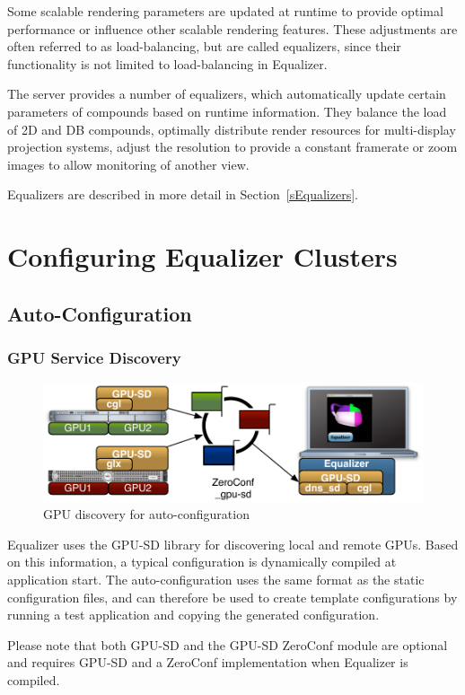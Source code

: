 \documentclass[10pt,a4]{scrartcl}
\newcommand{\sref}[1]{Section~\ref{#1}}
\begin{document}
Some scalable rendering parameters are updated at runtime to provide
optimal performance or influence other scalable rendering
features. These adjustments are often referred to as load-balancing, but
are called \textsf{equalizers}, since their functionality is not limited
to load-balancing in Equalizer.

The server provides a number of equalizers, which automatically update
certain parameters of compounds based on runtime information. They
balance the load of 2D and DB compounds, optimally distribute render
resources for multi-display projection systems, adjust the resolution
to provide a constant framerate or zoom images to allow monitoring of
another view.

Equalizers are described in more detail in \sref{sEqualizers}.


\section{\label{sConfig}Configuring Equalizer Clusters}

\subsection{\label{sAutoConfig}Auto-Configuration}

\subsubsection{GPU Service Discovery}

\begin{figure}
  \includegraphics[width=.618\textwidth]{images/gpu-sd.pdf}
  {\caption{\label{fGPUSD}GPU discovery for auto-configuration}}
\end{figure}
Equalizer uses the GPU-SD library for discovering local and remote GPUs. Based
on this information, a typical configuration is dynamically compiled at
application start. The auto-configuration uses the same format as the static
configuration files, and can therefore be used to create template configurations
by running a test application and copying the generated configuration.

Please note that both GPU-SD and the GPU-SD ZeroConf module are optional and
requires GPU-SD and a ZeroConf implementation when Equalizer is compiled.
\end{document}
